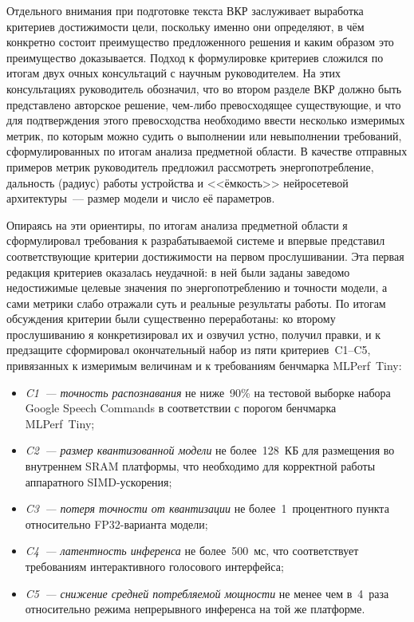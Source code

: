 Отдельного внимания при подготовке текста ВКР заслуживает
выработка критериев достижимости цели, поскольку именно они
определяют, в чём конкретно состоит преимущество предложенного
решения и каким образом это преимущество доказывается. Подход к
формулировке критериев сложился по итогам двух очных консультаций
с научным руководителем. На этих консультациях руководитель
обозначил, что во втором разделе ВКР должно быть представлено
авторское решение, чем-либо превосходящее существующие, и что
для подтверждения этого превосходства необходимо ввести
несколько измеримых метрик, по которым можно судить о выполнении
или невыполнении требований, сформулированных по итогам анализа
предметной области. В качестве отправных примеров метрик
руководитель предложил рассмотреть энергопотребление, дальность
(радиус) работы устройства и <<ёмкость>> нейросетевой
архитектуры~--- размер модели и число её параметров.

Опираясь на эти ориентиры, по итогам анализа предметной области
я сформулировал требования к разрабатываемой системе и впервые
представил соответствующие критерии достижимости на первом
прослушивании. Эта первая редакция критериев оказалась
неудачной: в ней были заданы заведомо недостижимые целевые
значения по энергопотреблению и точности модели, а сами метрики
слабо отражали суть и реальные результаты работы. По итогам
обсуждения критерии были существенно переработаны: ко второму
прослушиванию я конкретизировал их и озвучил устно, получил
правки, и к предзащите сформировал окончательный набор из пяти
критериев~C1--C5, привязанных к измеримым величинам и к
требованиям бенчмарка MLPerf~Tiny:

\begin{itemize}
	\item \textit{C1~--- точность распознавания} не ниже~90\%
	      на тестовой выборке набора Google Speech Commands в
	      соответствии с порогом бенчмарка MLPerf~Tiny;
	\item \textit{C2~--- размер квантизованной модели} не
	      более~128~КБ для размещения во внутреннем SRAM
	      платформы, что необходимо для корректной работы
	      аппаратного SIMD-ускорения;
	\item \textit{C3~--- потеря точности от квантизации} не
	      более~1~процентного пункта относительно
	      FP32-варианта модели;
	\item \textit{C4~--- латентность инференса} не более~500~мс,
	      что соответствует требованиям интерактивного
	      голосового интерфейса;
	\item \textit{C5~--- снижение средней потребляемой мощности}
	      не менее чем в~4~раза относительно режима непрерывного
	      инференса на той же платформе.
\end{itemize}

